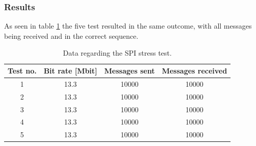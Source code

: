 \documentclass[../../main.tex]{subfiles}
\begin{document}
\subsubsection*{Results}

As seen in table \ref{tab:SPI-stresstest} the five test resulted in the same outcome, with all messages being received and in the correct sequence. 
\begin{table}[H]
\centering
\begin{tabular}{c|c c c}
\textbf{Test no.} & \textbf{Bit rate {[}Mbit{]}} & \textbf{Messages sent} & \textbf{Messages received} \\ \hline
1 & 13.3 & 10000 & 10000 \\
2 & 13.3 & 10000 & 10000 \\
3 & 13.3 & 10000 & 10000 \\
4 & 13.3 & 10000 & 10000 \\
5 & 13.3 & 10000 & 10000
\end{tabular}
\caption{Data regarding the SPI stress test.}
\label{tab:SPI-stresstest}
\end{table}
\end{document}
